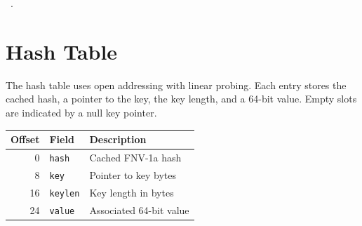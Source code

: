 \documentclass[11pt,a4paper,twoside,openright,DIV=15]{scrbook}
\theoremstyle{definition}
\theoremstyle{plain}
\theoremstyle{remark}
\begin{document}
\begin{flushleft}
\begin{minipage}{\linewidth}
\vspace{-1.5ex}
\footnotesize
\begin{list}{}{\setlength{\itemsep}{-\parsep}\setlength{\itemindent}{-\leftmargin}}
\item \NWtxtMacroRefIn\ .

\item{}
\end{list}
\end{minipage}\vspace{4ex}
\end{flushleft}
\section{Hash Table}

The hash table uses open addressing with linear probing.  Each entry
stores the cached hash, a pointer to the key, the key length, and a
64-bit value.  Empty slots are indicated by a null key pointer.

\begin{center}
\begin{tabular}{rll}
\hline
Offset & Field & Description \\
\hline
0  & \texttt{hash}   & Cached FNV-1a hash \\
8  & \texttt{key}    & Pointer to key bytes \\
16 & \texttt{keylen} & Key length in bytes \\
24 & \texttt{value}  & Associated 64-bit value \\
\hline
\end{tabular}
\end{center}
\end{document}
